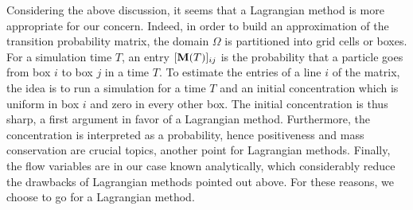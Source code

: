 Considering the above discussion, it seems that a Lagrangian method is more appropriate for our concern. Indeed, in order to build an approximation of the transition probability matrix, the domain $\Omega$ is partitioned into grid cells or boxes. For a simulation time $T$, an entry $[\mathbf M(T)]_{ij}$ is the probability that a particle goes from box $i$ to box $j$ in a time $T$. To estimate the entries of a line $i$ of the matrix, the idea is to run a simulation for a time $T$ and an initial concentration which is uniform in box $i$ and zero in every other box. The initial concentration is thus sharp, a first argument in favor of a Lagrangian method. Furthermore, the concentration is interpreted as a probability, hence positiveness and mass conservation are crucial topics, another point for Lagrangian methods. Finally, the flow variables are in our case known analytically, which considerably reduce the drawbacks of Lagrangian methods pointed out above. For these reasons, we choose to go for a Lagrangian method. 


